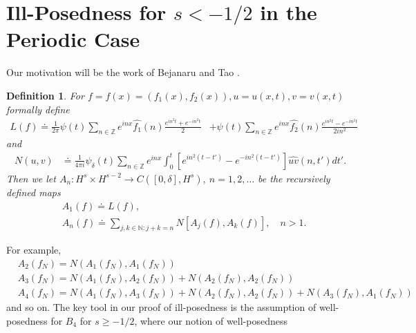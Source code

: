 \documentclass[12pt,reqno]{amsart}
\numberwithin{equation}{section}  %
\newcommand{\zz}{\mathbb{Z}}
\newcommand{\wh}{\widehat}
\newtheorem{definition}[theorem]{Definition}
\begin{document}
\section{Ill-Posedness for $s < -1/2$ in the Periodic Case}
Our motivation will be the work of Bejanaru and Tao
\cite{Bejenaru-Tao-2006-Sharp-well-posedness-and-ill-posedness}. 
%
\begin{definition}
  For $f =f(x)= (f_{1}(x), f_{2}(x)), u = u(x,t), v = v(x,t)$ formally define 
%
%
\begin{equation*}
\begin{split}
  L(f)
  \doteq \frac{1}{2 \pi} \psi(t) \sum_{n \in \zz} e^{inx}
  \wh{f_{1}}(n) \frac{e^{in^{2}t} + e^{-in^{2}t}}{2} 
  & + \psi(t) \sum_{n \in \zz} e^{inx}
  \wh{f_{2}}(n)\frac{e^{in^{2}t} - e^{-in^{2}t}}{2 i n^{2}} 
\end{split}
\end{equation*}
%
%
and
%
%
\begin{equation*}
\begin{split}
N(u, v)
& \doteq \frac{1}{4 \pi i} \psi_{\delta}(t) \sum_{n \in \zz} e^{inx}
    \int_{0}^{t}[e^{in^{2}(t-t')}-e^{-in^{2}(t-t')}]
    \wh{uv}(n, t') dt'.
\end{split}
\end{equation*}
%
%
Then we let $A_{n}: H^{s} \times H^{s-2} \to C([0, \delta], H^{s}), \ n = 1, 2, \dots$ be the
recursively defined maps
%
%
\begin{equation*}
\begin{split}
  & A_{1}(f) \doteq L(f),
  \\
  & A_{n}(f) \doteq \sum_{j, k \in \mathbb{N}: j + k = n} N\left[
  A_{j}(f), A_{k}(f) \right], \quad n > 1.
\end{split}
\end{equation*}
\end{definition}
%
%
%
For example, 
%
%
\begin{equation*}
\begin{split}
  & A_{2}(f_{N}) = N(A_{1}(f_{N}), A_{1}(f_{N}))
  \\
  & A_{3}(f_{N}) = N(A_{1}(f_{N}), A_{2}(f_{N})) + N(A_{2}(f_{N}), A_{2}(f_{N}))
  \\
  & A_{4}(f_{N})= N(A_{1}(f_{N}), A_{3}(f_{N})) + N(A_{2}(f_{N}), A_{2}(f_{N}))
  + N(A_{3}(f_{N}), A_{1}(f_{N}))
\end{split}
\end{equation*}
%
%
and so on. The key tool in our proof of ill-posedness is the assumption of
well-posedness for $B_{4}$ for $s \ge -1/2$, where our notion of well-posedness
\end{document}
